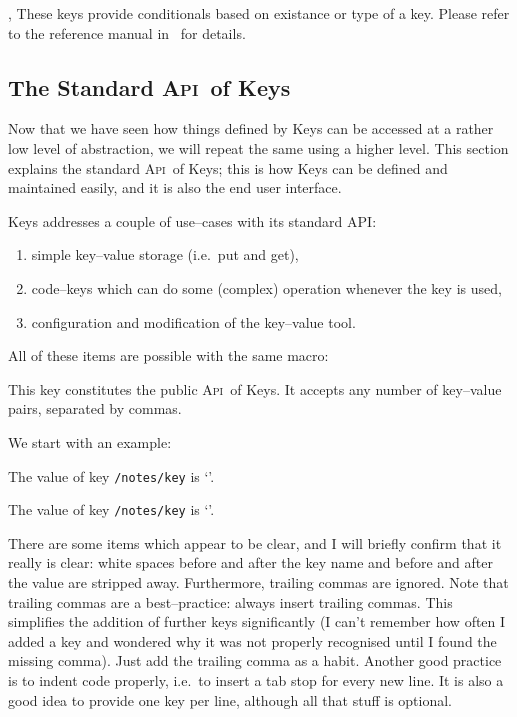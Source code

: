 \documentclass[a4paper,doc2]{ltxdoc}
\def\API{\textsc{Api}}%
\begin{document}
\begin{commandlist}{%
	\pgfkeysifdefined{},
	\pgfkeysifassignable{}}
	These keys provide conditionals based on existance or type of a key. Please refer to the reference manual in~\cite{tikz} for details.
\end{commandlist}

\subsection{The Standard \API\ of \PGF Keys}
\begingroup
{}
Now that we have seen how things defined by \PGF Keys can be accessed at a rather low level of abstraction, we will repeat the same using a higher level. This section explains the standard \API\ of \PGF Keys; this is how Keys can be defined and maintained easily, and it is also the end user interface.

\PGF Keys addresses a couple of use--cases with its standard API:
\begin{enumerate}
	\item simple key--value storage (i.e.\ put and get),
	\item code--keys which can do some (complex) operation whenever the key is used,
	\item configuration and modification of the key--value tool.
\end{enumerate}
All of these items are possible with the same macro:

\begin{command}{\pgfkeys{}}
	This key constitutes the public \API\ of \PGF Keys. It accepts any number of key--value pairs, separated by commas.
\end{command}

We start with an example:
\begin{codeexample}[]

The value of key \texttt{/notes/key} is `'.


The value of key \texttt{/notes/key} is `'.
\end{codeexample}

There are some items which appear to be clear, and I will briefly confirm that it really is clear: white spaces before and after the key name and before and after the value are stripped away. Furthermore, trailing commas are ignored. Note that trailing commas are a best--practice: always insert trailing commas. This simplifies the addition of further keys significantly (I can't remember how often I added a key and wondered why it was not properly recognised until I found the missing comma). Just add the trailing comma as a habit. Another good practice is to indent code properly, i.e.\ to insert a tab stop for every new line. It is also a good idea to provide one key per line, although all that stuff is optional.
\end{document}
